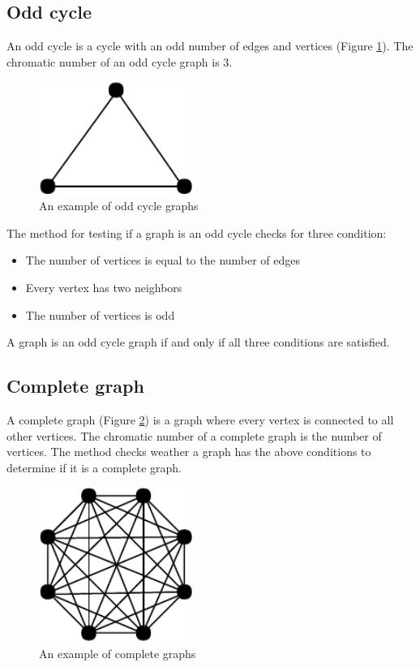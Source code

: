\documentclass[a4paper]{report}
\begin{document}
			\subsection{Odd cycle}
			An odd cycle is a cycle with an odd number of edges and vertices (Figure \ref{fig:oddcycle}). The chromatic number of an odd cycle graph is 3. \\
			
			\begin{figure}[h]
				\centering
				\includegraphics[width=50mm,scale=0.5]{figures/cycle.pdf}
				\caption{An example of odd cycle graphs}
				\label{fig:oddcycle}
			\end{figure}
		
			The method for testing if a graph is an odd cycle checks for three condition:
			\begin{itemize}
				\item The number of vertices is equal to the number of edges
				\item Every vertex has two neighbors
				\item The number of vertices is odd
			\end{itemize}
			A graph is an odd cycle graph if and only if all three conditions are satisfied.
			
			\subsection{Complete graph}
			A complete graph (Figure \ref{fig:complete}) is a graph where every vertex is connected to all other vertices. The chromatic number of a complete graph is the number of vertices. The method checks weather a graph has the above conditions to determine if it is a complete graph.
			\begin{figure}[h]
				\centering
				\includegraphics[width=50mm,scale=0.5]{figures/complete.pdf}
				\caption{An example of complete graphs}
				\label{fig:complete}
			\end{figure}
			
\end{document}
